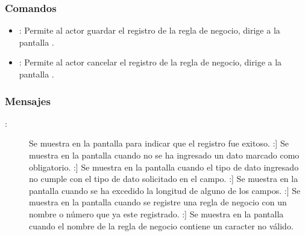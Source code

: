 \subsubsection{Comandos}
\begin{itemize}
	\item {}: Permite al actor guardar el registro de la regla de negocio, dirige a la pantalla .
	\item {}: Permite al actor cancelar el registro de la regla de negocio, dirige a la pantalla .
\end{itemize}

\subsubsection{Mensajes}
	
\begin{description}
	\item[:] Se muestra en la pantalla  para indicar que el registro fue exitoso.
	\UCli {}:] Se muestra en la pantalla  cuando no se ha ingresado un dato marcado como obligatorio.
	\UCli {}:] Se muestra en la pantalla  cuando el tipo de dato ingresado no cumple con el tipo de dato solicitado en el campo.
	\UCli {}:] Se muestra en la pantalla  cuando se ha excedido la longitud de alguno de los campos.
	\UCli {}:] Se muestra en la pantalla  cuando se registre una regla de negocio con un nombre o número que ya este registrado.
	\UCli {}:] Se muestra en la pantalla  cuando el nombre de la regla de negocio contiene un caracter no válido.
\end{description}
